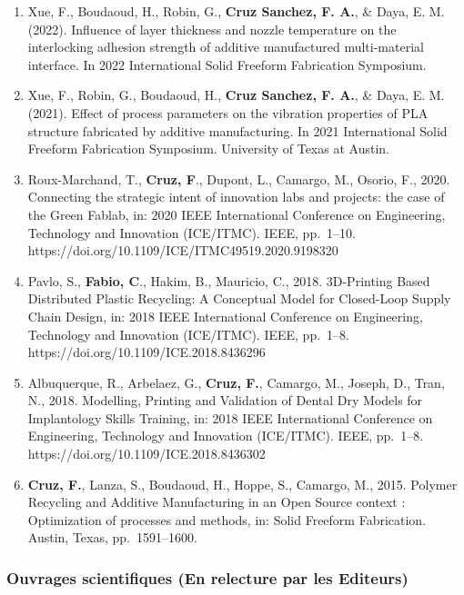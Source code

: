 \documentclass[
  11pt,
]{article}
\begin{document}
\begin{enumerate}
\def\labelenumi{\arabic{enumi}.}
\item
  Xue, F., Boudaoud, H., Robin, G., \textbf{Cruz Sanchez, F. A.}, \&
  Daya, E. M. (2022). Influence of layer thickness and nozzle
  temperature on the interlocking adhesion strength of additive
  manufactured multi-material interface. In 2022 International Solid
  Freeform Fabrication Symposium.
\item
  Xue, F., Robin, G., Boudaoud, H., \textbf{Cruz Sanchez, F. A.}, \&
  Daya, E. M. (2021). Effect of process parameters on the vibration
  properties of PLA structure fabricated by additive manufacturing. In
  2021 International Solid Freeform Fabrication Symposium. University of
  Texas at Austin.
\item
  Roux-Marchand, T., \textbf{Cruz, F}., Dupont, L., Camargo, M., Osorio,
  F., 2020. Connecting the strategic intent of innovation labs and
  projects: the case of the Green Fablab, in: 2020 IEEE International
  Conference on Engineering, Technology and Innovation (ICE/ITMC). IEEE,
  pp.~1--10. https://doi.org/10.1109/ICE/ITMC49519.2020.9198320
\item
  Pavlo, S., \textbf{Fabio, C}., Hakim, B., Mauricio, C., 2018.
  3D-Printing Based Distributed Plastic Recycling: A Conceptual Model
  for Closed-Loop Supply Chain Design, in: 2018 IEEE International
  Conference on Engineering, Technology and Innovation (ICE/ITMC). IEEE,
  pp.~1--8. https://doi.org/10.1109/ICE.2018.8436296
\item
  Albuquerque, R., Arbelaez, G., \textbf{Cruz, F.}, Camargo, M., Joseph,
  D., Tran, N., 2018. Modelling, Printing and Validation of Dental Dry
  Models for Implantology Skills Training, in: 2018 IEEE International
  Conference on Engineering, Technology and Innovation (ICE/ITMC). IEEE,
  pp.~1--8. https://doi.org/10.1109/ICE.2018.8436302
\item
  \textbf{Cruz, F.}, Lanza, S., Boudaoud, H., Hoppe, S., Camargo, M.,
  2015. Polymer Recycling and Additive Manufacturing in an Open Source
  context : Optimization of processes and methods, in: Solid Freeform
  Fabrication. Austin, Texas, pp.~1591--1600.
\end{enumerate}

\hypertarget{ouvrages-scientifiques-en-relecture-par-les-editeurs}{%
\subsubsection{Ouvrages scientifiques (En relecture par les
Editeurs)}\label{ouvrages-scientifiques-en-relecture-par-les-editeurs}}
\end{document}
